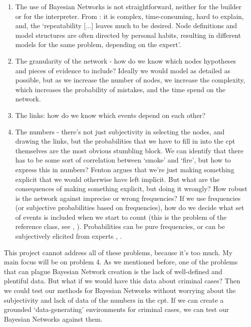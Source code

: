\begin{enumerate}
\item The use of Bayesian Networks is not straightforward, neither for the builder or for the interpreter. From \citet{deKoeijer2020}: it is complex, time-consuming, hard to explain, and, the `repeatability [...] leaves much to be desired. Node definitions and model structures are often directed by personal habits, resulting in different models for the same problem, depending on the expert'.
\item The granularity of the network - how do we know which nodes hypotheses and pieces of evidence to include? Ideally we would model as detailed as possible, but as we increase the number of nodes, we increase the complexity, which increases the probability of mistakes, and the time spend on the network.
\item The links: how do we know which events depend on each other?
\item The numbers - there's not just subjectivity in selecting the nodes, and drawing the links, but the probabilities that we have to fill in into the cpt themselves are the most obvious stumbling block. We can identify that there has to be some sort of correlation between `smoke' and `fire', but how to express this in numbers? Fenton argues that we're just making something explicit that we would otherwise have left implicit. But what are the consequences of making something explicit, but doing it wrongly? How robust is the network against imprecise or wrong frequencies? If we use frequencies (or subjective probabilities based on frequencies), how do we decide what set of events is included when we start to count (this is the problem of the reference class, see \citep{Allan2007}, \citep{colyvan2001}). Probabilities can be pure frequencies, or can be subjectively elicited from experts \citep{renooij2001}, \citep{Druzdzel2000}.
\end{enumerate}


This project cannot address all of these problems, because it's too much. My main focus will be on problem 4. As we mentioned before, one of the problems that can plague Bayesian Network creation is the lack of well-defined and plentiful data. But what if we would have this data about criminal cases? Then we could test our methods for Bayesian Networks without worrying about the subjectivity and lack of data of the numbers in the cpt. If we can create a grounded `data-generating' environments for criminal cases, we can test our Bayesian Networks against them.

